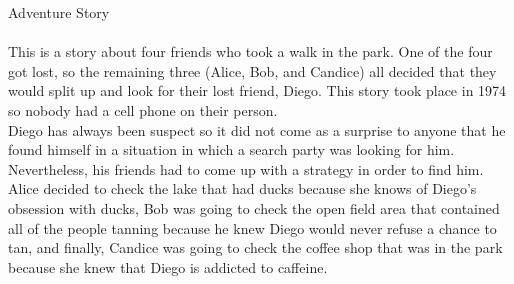 \documentclass{article}
\begin{document}
\large{Adventure Story} \\ \\
This is a story about four friends who took a walk in the park. One of the four got lost, so the remaining three (Alice, Bob, and Candice) all decided that they would split up and look for their lost friend, Diego. This story took place in 1974 so nobody had a cell phone on their person.\\
Diego has always been suspect so it did not come as a surprise to anyone that he found himself in a situation in which a search party was looking for him. Nevertheless, his friends had to come up with a strategy in order to find him. Alice decided to check the lake that had ducks because she knows of Diego's obsession with ducks, Bob was going to check the open field area that contained all of the people tanning because he knew Diego would never refuse a chance to tan, and finally, Candice was going to check the coffee shop that was in the park because she knew that Diego is addicted to caffeine.\\
\end{document}
